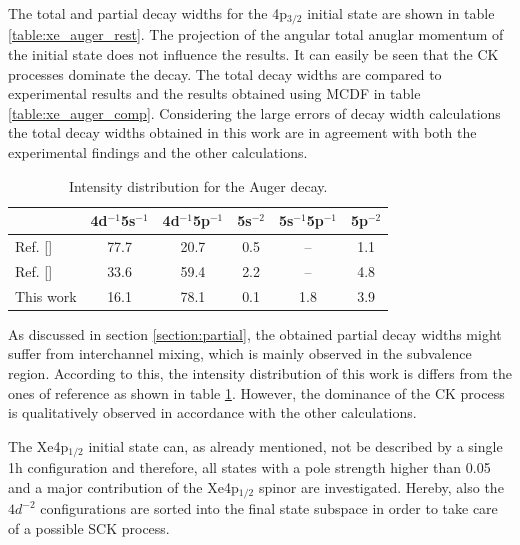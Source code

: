 The total and partial decay widths for the 4p$_{3/2}$ initial state
are shown in table \ref{table:xe_auger_rest}. The projection of the
angular total anuglar momentum of the initial state does not influence
the results. It can easily be seen that
the \ac{CK} processes dominate the decay. The total decay widths are compared
to experimental results and the results obtained using \ac{MCDF} in
table \ref{table:xe_auger_comp}.
Considering the large errors of decay width calculations the total decay widths
obtained in this work are in agreement with both the experimental findings and
the other calculations.

\begin{table}[h]
  \centering
  \caption{Intensity distribution for the Auger decay.}
  \begin{tabular}{lccccc}
   \toprule
                   & 4d$^{-1}$5s$^{-1}$ & 4d$^{-1}$5p$^{-1}$ & 5s$^{-2}$ & 5s$^{-1}$5p$^{-1}$ & 5p$^{-2}$ \\
   \midrule
   Ref. [\cite{Heinaesmaeki04}]\footnotemark[1] & 77.7 & 20.7  &       0.5 &       --           & 1.1     \\
   Ref. [\cite{Heinaesmaeki04}]\footnotemark[2] & 33.6 & 59.4  &       2.2 &       --           & 4.8     \\
   This work       &      16.1          &       78.1         &    0.1    &     1.8            & 3.9    \\
   \bottomrule
  \end{tabular}
  \label{table:Xe_auger_distr}
\end{table}

As discussed in section \ref{section:partial}, the obtained partial decay
widths might suffer from interchannel mixing, which is mainly observed in
the subvalence region. According to this, the intensity distribution
of this work is differs from the ones of reference \cite{Heinaesmaeki04} as
shown in table \ref{table:Xe_auger_distr}. However, the dominance of the
\ac{CK} process is qualitatively observed in accordance with the other
calculations.


The Xe4p$_{1/2}$ initial state can, as already mentioned, not be described
by a single 1h configuration and therefore, all states with a pole strength
higher than 0.05 and a major contribution of the Xe4p$_{1/2}$ spinor are
investigated. Hereby, also the $4d^{-2}$ configurations are sorted into the
final state subspace in order to take care of a possible \ac{SCK} process.

